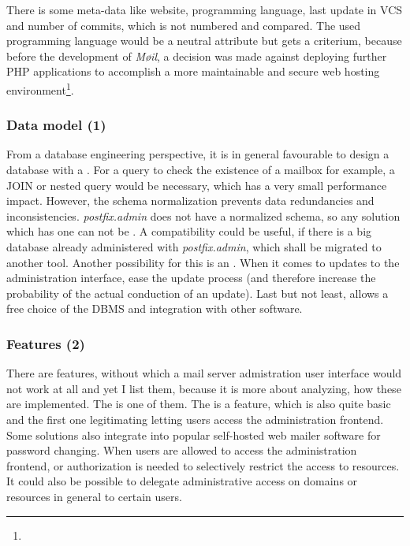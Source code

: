 \documentclass[12pt,a4paper]{scrartcl}
\begin{document}
			There is some meta-data like website, programming language, last
			update in VCS and number of commits, which is not numbered and
			compared. The used programming language would be a neutral
			attribute but gets a criterium, because before the development of
			\emph{Møil}, a decision was made against deploying further PHP
			applications to accomplish a more maintainable and secure web
			hosting environment\footnote{\urlPHPBashing}.

			\subsubsection*{Data model (1)}
				From a database engineering perspective, it is in general
				favourable to design a database with a  \cite{dbnorm}. For a query to
				check the existence of a mailbox for example, a JOIN or nested
				query would be necessary, which has a very small performance
				impact. However, the schema normalization prevents data
				redundancies and inconsistencies. \emph{postfix.admin} does not
				have a normalized schema, so any solution which has one can not
				be . A
				compatibility could be useful, if there is a big database
				already administered with \emph{postfix.admin}, which shall be
				migrated to another tool. Another possibility for this is an
				. When it comes
				to updates to the administration interface,  ease the update process
				(and therefore increase the probability of the actual
				conduction of an update). Last but not least,  allows a free choice of the \ac{DBMS} and
				integration with other software.

			\subsubsection*{Features (2)}
				There are features, without which a mail server admistration
				user interface would not work at all and yet I list them,
				because it is more about analyzing, how these are implemented.
				The  is
				one of them. The  is a feature, which is also quite basic and the
				first one legitimating letting users access the administration
				frontend. Some solutions also integrate into popular
				self-hosted web mailer software for password changing. When
				users are allowed to access the administration frontend,
				 or authorization is needed to
				selectively restrict the access to resources. It could also be
				possible to delegate administrative access on domains or
				resources in general to certain users.
				\s
\end{document}
